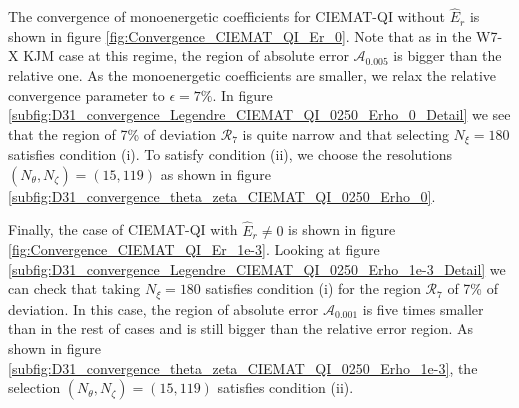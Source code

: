The convergence of monoenergetic coefficients for CIEMAT-QI without $\hat{E}_r$ is shown in figure \ref{fig:Convergence_CIEMAT_QI_Er_0}. Note that as in the W7-X KJM case at this regime, the region of absolute error $\mathcal{A}_{0.005}$ is bigger than the relative one. As the monoenergetic coefficients are smaller, we relax the relative convergence parameter to $\epsilon=7\%$. In figure \ref{subfig:D31_convergence_Legendre_CIEMAT_QI_0250_Erho_0_Detail} we see that the region of 7\% of deviation $\mathcal{R}_{7}$ is quite narrow and that selecting $N_\xi=180$ satisfies condition (i). To satisfy condition (ii), we choose the resolutions $(N_\theta,N_\zeta)=(15,119)$ as shown in figure \ref{subfig:D31_convergence_theta_zeta_CIEMAT_QI_0250_Erho_0}. 



Finally, the case of CIEMAT-QI with $\hat{E}_r\ne 0$ is shown in figure \ref{fig:Convergence_CIEMAT_QI_Er_1e-3}. Looking at figure \ref{subfig:D31_convergence_Legendre_CIEMAT_QI_0250_Erho_1e-3_Detail} we can check that taking $N_\xi=180$ satisfies condition (i) for the region $\mathcal{R}_7$ of 7\% of deviation. In this case, the region of absolute error $\mathcal{A}_{0.001}$ is five times smaller than in the rest of cases and is still bigger than the relative error region. As shown in figure \ref{subfig:D31_convergence_theta_zeta_CIEMAT_QI_0250_Erho_1e-3}, the selection $(N_\theta,N_\zeta)=(15,119)$ satisfies condition (ii).









